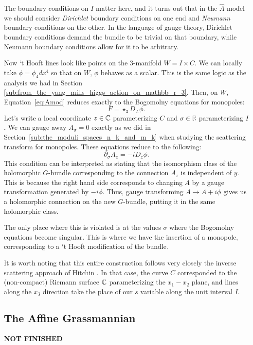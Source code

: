 	The boundary conditions on $I$ matter here, and it turns out that in the $\hat A$ model we should consider \emph{Dirichlet} boundary conditions on one end and \emph{Neumann} boundary conditions on the other. In the language of gauge theory, Dirichlet boundary conditions demand the bundle to be trivial on that boundary, while Neumann boundary conditions allow for it to be arbitrary.
	
	Now `t Hooft lines look like points on the 3-manifold $W = I \times C$. We can locally take $\phi = \phi_4 dx^4$ so that on $W$, $\phi$ behaves as a scalar. This is the same logic as the analysis we had in Section \ref{sub:from_the_yang_mills_higgs_action_on_mathbb_r_3}.
	Then, on $W$, Equation~\eqref{eq:Amod} reduces exactly to the Bogomolny equations for monopoles:
	\[
		F = \star_3 D_A \phi.
	\]
	Let's write a local coordinate $z \in \mathbb{C}$ parameterizing $C$ and $\sigma \in \mathbb R$ parameterizing $I$.
	We can gauge away $A_\sigma = 0$ exactly as we did in Section~\ref{sub:the_moduli_spaces_n_k_and_m_k} when studying the scattering transform for monopoles. These equations reduce to the following:
	\[
		\partial_\sigma A_{\bar z} = - i D_{\bar z} \phi.
	\]
	This condition can be interpreted as stating that the isomorphism class of the holomorphic $G$-bundle corresponding to the connection $A_{\bar z}$ is independent of $y$. This is because the right hand side corresponds to changing $A$ by a gauge transformation generated by $-i \phi$. Thus, gauge transforming $A \to A + i \phi$ gives us a holomorphic connection on the new $G$-bundle, putting it in the same holomorphic class.
	
	 The only place where this is violated is at the values $\sigma$ where the Bogomolny equations become singular. This is where we have the insertion of a monopole, corresponding to a `t Hooft modification of the bundle. 
	 
	 It is worth noting that this entire construction follows very closely the inverse scattering approach of Hitchin \cite{hitchin1982, atiyahhitchin1988}. In that case, the curve $C$ corresponded to the (non-compact) Riemann surface $\mathbb{C}$ parameterizing the $x_1-x_2$ plane, and lines along the $x_3$ direction take the place of our $s$ variable along the unit interval $I$.
	
	\subsection{The Affine Grassmannian}
	
	\textbf{NOT FINISHED}
	
